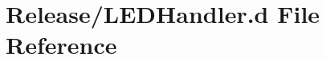 \hypertarget{_l_e_d_handler_8d}{}\section{Release/\+L\+E\+D\+Handler.d File Reference}
\label{_l_e_d_handler_8d}
